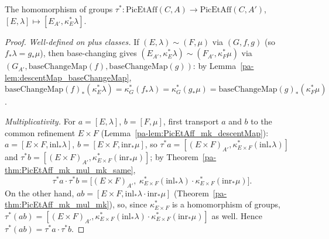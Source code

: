 \begin{definition}
  \label{pa-def:PicEtAff_map}
  \leanok

  The homomorphism of groups \(\tau^{*} \colon \mathrm{PicEtAff}(C,A) \to
  \mathrm{PicEtAff}(C,A')\), \([E,\lambda] \mapsto [E_{A'}, \kappa_E^{*}\lambda]\).
\end{definition}
\begin{proof}
  \leanok
  \emph{Well-defined on plus classes.} If \((E,\lambda) \sim (F,\mu)\) via \((G,f,g)\)
  (so \(f_{*}\lambda = g_{*}\mu\)), then base-changing gives \((E_{A'},\kappa_E^{*}\lambda) \sim
  (F_{A'},\kappa_F^{*}\mu)\) via \((G_{A'}, \mathrm{baseChangeMap}(f),
  \mathrm{baseChangeMap}(g))\): by Lemma~\ref{pa-lem:descentMap_baseChangeMap},
  \(\mathrm{baseChangeMap}(f)_{*}(\kappa_E^{*}\lambda) = \kappa_G^{*}(f_{*}\lambda) =
  \kappa_G^{*}(g_{*}\mu) = \mathrm{baseChangeMap}(g)_{*}(\kappa_F^{*}\mu)\).

  \emph{Multiplicativity.} For \(a = [E,\lambda]\), \(b = [F,\mu]\), first transport \(a\) and
  \(b\) to the common refinement \(E \times F\) (Lemma~\ref{pa-lem:PicEtAff_mk_descentMap}):
  \(a = [E \times F, \mathrm{inl}_{*}\lambda]\), \(b = [E \times F, \mathrm{inr}_{*}\mu]\), so
  \(\tau^{*}a = [(E \times F)_{A'}, \kappa_{E \times F}^{*}(\mathrm{inl}_{*}\lambda)]\) and
  \(\tau^{*}b = [(E \times F)_{A'}, \kappa_{E \times F}^{*}(\mathrm{inr}_{*}\mu)]\); by
  Theorem~\ref{pa-thm:PicEtAff_mk_mul_mk_same},
  \[
    \tau^{*}a \cdot \tau^{*}b = \bigl[(E \times F)_{A'},\ \kappa_{E \times F}^{*}
    (\mathrm{inl}_{*}\lambda) \cdot \kappa_{E \times F}^{*}(\mathrm{inr}_{*}\mu)\bigr].
  \]
  On the other hand, \(ab = [E \times F, \mathrm{inl}_{*}\lambda \cdot \mathrm{inr}_{*}\mu]\)
  (Theorem~\ref{pa-thm:PicEtAff_mk_mul_mk}), so, since \(\kappa_{E \times F}^{*}\) is a
  homomorphism of groups, \(\tau^{*}(ab) = [(E \times F)_{A'}, \kappa_{E \times F}^{*}
  (\mathrm{inl}_{*}\lambda) \cdot \kappa_{E \times F}^{*}(\mathrm{inr}_{*}\mu)]\) as well. Hence
  \(\tau^{*}(ab) = \tau^{*}a \cdot \tau^{*}b\).
\end{proof}

